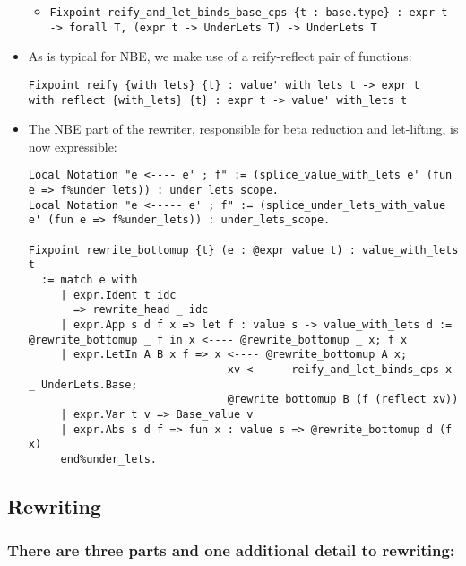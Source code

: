 \begin{itemize}
  \begin{itemize}
  \tightlist
  \item
    \texttt{Fixpoint\ reify\_and\_let\_binds\_base\_cps\ \{t\ :\ base.type\}\ :\ expr\ t\ -\textgreater{}\ forall\ T,\ (expr\ t\ -\textgreater{}\ UnderLets\ T)\ -\textgreater{}\ UnderLets\ T}
  \end{itemize}
\item
  As is typical for NBE, we make use of a reify-reflect pair of
  functions:

\begin{verbatim}
Fixpoint reify {with_lets} {t} : value' with_lets t -> expr t
with reflect {with_lets} {t} : expr t -> value' with_lets t
\end{verbatim}
\item
  The NBE part of the rewriter, responsible for beta reduction and
  let-lifting, is now expressible:

\begin{verbatim}
Local Notation "e <---- e' ; f" := (splice_value_with_lets e' (fun e => f%under_lets)) : under_lets_scope.
Local Notation "e <----- e' ; f" := (splice_under_lets_with_value e' (fun e => f%under_lets)) : under_lets_scope.

Fixpoint rewrite_bottomup {t} (e : @expr value t) : value_with_lets t
  := match e with
     | expr.Ident t idc
       => rewrite_head _ idc
     | expr.App s d f x => let f : value s -> value_with_lets d := @rewrite_bottomup _ f in x <---- @rewrite_bottomup _ x; f x
     | expr.LetIn A B x f => x <---- @rewrite_bottomup A x;
                               xv <----- reify_and_let_binds_cps x _ UnderLets.Base;
                               @rewrite_bottomup B (f (reflect xv))
     | expr.Var t v => Base_value v
     | expr.Abs s d f => fun x : value s => @rewrite_bottomup d (f x)
     end%under_lets.
\end{verbatim}
\end{itemize}

\hypertarget{rewriting}{%
\subsection{Rewriting}\label{rewriting}}

\hypertarget{there-are-three-parts-and-one-additional-detail-to-rewriting}{%
\subsubsection{There are three parts and one additional detail to
rewriting:}\label{there-are-three-parts-and-one-additional-detail-to-rewriting}}

